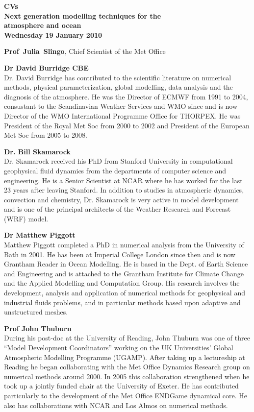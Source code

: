 

\begin{center}
\large\bf
    CVs \\
    Next generation modelling techniques for the \\atmosphere and ocean \\
    Wednesday 19 January 2010
\end{center}

{\bf Prof~Julia~Slingo}, Chief Scientist of the Met Office

{\bf Dr David Burridge CBE} \\
Dr. David Burridge has contributed to the scientific literature on numerical methods, physical parameterization, global modelling, data analysis and the diagnosis of the atmosphere. He was the Director of ECMWF from 1991 to 2004, consustant to the Scandinavian Weather Services and WMO since and is now Director of the WMO International Programme Office for THORPEX. He was President of the Royal Met Soc from 2000 to 2002 and President of the European Met Soc from 2005 to 2008.

{\bf Dr. Bill Skamarock} \\
Dr. Skamarock received his PhD from Stanford University in computational geophysical fluid dynamics from the departments of computer science and engineering. He is a Senior Scientist at NCAR where he has worked for the last 23 years after leaving Stanford. In addition to studies in atmospheric dynamics, convection and chemistry, Dr. Skamarock is very active in model development and is one of the principal architects of the Weather Research and Forecast (WRF) model.

{\bf Dr Matthew Piggott} \\
Matthew Piggott completed a PhD in numerical analysis from the University of Bath in 2001. He has been at Imperial College London since then and is now Grantham Reader in Ocean Modelling. He is based in the Dept. of Earth Science and Engineering and is attached to the Grantham Institute for Climate Change and the Applied Modelling and Computation Group. His research involves the development, analysis and application of numerical methods for geophysical and industrial fluids problems, and in particular methods based upon adaptive and unstructured meshes.

{\bf Prof John Thuburn} \\
During his post-doc at the University of Reading, John Thuburn was one of three ``Model Development Coordinators'' working on the UK Universities' Global Atmospheric Modelling Programme (UGAMP). After taking up a lectureship at Reading he began collaborating with the Met Office Dynamics Research group on numerical methods around 2000. In 2005 this collaboration strengthened when he took up a jointly funded chair at the University of Exeter. He has contributed particularly to the development of the Met Office ENDGame dynamical core. He also has collaborations with NCAR and Los Almos on numerical methods.

